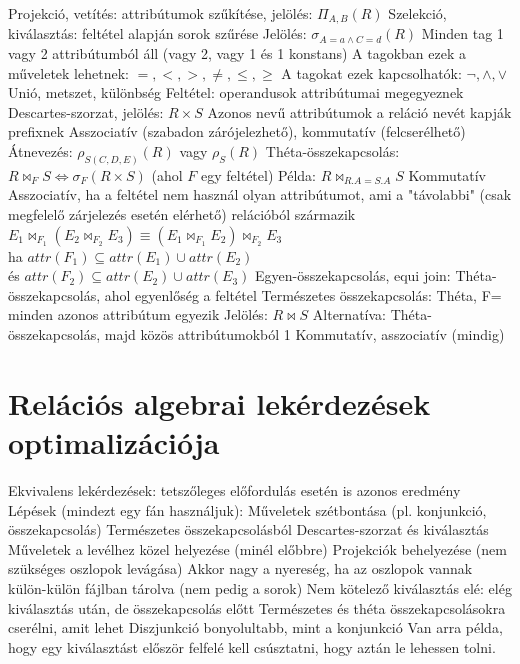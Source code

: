\documentclass[12pt,a4paper]{article}
\begin{document}
\begin{outline}
	\1 Projekció, vetítés: attribútumok szűkítése, jelölés: $\Pi_{A,B}(R)$
	\1 Szelekció, kiválasztás: feltétel alapján sorok szűrése
		\2 Jelölés: $\sigma_{A=a \wedge C=d}(R)$
		\2 Minden tag 1 vagy 2 attribútumból áll (vagy 2, vagy 1 és 1 konstans)
		\2 A tagokban ezek a műveletek lehetnek: $=, <, >, \ne, \le, \ge$
		\2 A tagokat ezek kapcsolhatók: $\lnot, \wedge, \lor$
	\1 Unió, metszet, különbség
		\2 Feltétel: operandusok attribútumai megegyeznek
	\1 Descartes-szorzat, jelölés: $R \times S$
		\2 Azonos nevű attribútumok a reláció nevét kapják prefixnek
		\2 Asszociatív (szabadon zárójelezhető), kommutatív (felcserélhető)
	\1 Átnevezés: $\rho_{S(C,D,E)}(R)$ vagy $\rho_S(R)$
	\1 Théta-összekapcsolás: $R \bowtie_F S \Leftrightarrow \sigma_F (R \times S)$ \;
	(ahol $F$ egy feltétel)
		\2 Példa: $R \bowtie_{R.A = S.A} S$
		\2 Kommutatív
		\2 Asszociatív, ha a feltétel nem használ olyan attribútumot, ami a "távolabbi" (csak megfelelő zárjelezés esetén elérhető) relációból származik
			\3 $E_1 \bowtie_{F_1} (E_2 \bowtie_{F_2} E_3) \equiv (E_1 \bowtie_{F_1} E_2) \bowtie_{F_2} E_3$\\
			ha $attr(F_1) \subseteq attr(E_1) \cup attr(E_2)$\\
			és \;$attr(F_2) \subseteq attr(E_2) \cup attr(E_3)$
	\1 Egyen-összekapcsolás, equi join:
		\2 Théta-összekapcsolás, ahol egyenlőség a feltétel
	\1 Természetes összekapcsolás: Théta, F= minden azonos attribútum egyezik
		\2 Jelölés: $R \bowtie S$
		\2 Alternatíva: Théta-összekapcsolás, majd közös attribútumokból 1
		\2 Kommutatív, asszociatív (mindig)
\end{outline}

\pagebreak

\section{Relációs algebrai lekérdezések optimalizációja}

\begin{outline}
	\1 Ekvivalens lekérdezések: tetszőleges előfordulás esetén is azonos eredmény
	\1 Lépések (mindezt egy fán használjuk):
		\2 Műveletek szétbontása (pl. konjunkció, összekapcsolás)
			\3 Természetes összekapcsolásból Descartes-szorzat és kiválasztás
		\2 Műveletek a levélhez közel helyezése (minél előbbre)
		\2 Projekciók behelyezése (nem szükséges oszlopok levágása)
			\3 Akkor nagy a nyereség, ha az oszlopok vannak külön-külön fájlban tárolva (nem pedig a sorok)
			\3 Nem kötelező kiválasztás elé: elég kiválasztás után, de összekapcsolás előtt
		\2 Természetes és théta összekapcsolásokra cserélni, amit lehet
	\1 Diszjunkció bonyolultabb, mint a konjunkció
	\1 Van arra példa, hogy egy kiválasztást először felfelé kell csúsztatni, hogy
	aztán le lehessen tolni.
\end{outline}
\end{document}
